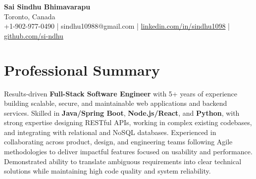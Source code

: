 \documentclass[letterpaper,11pt]{article}
\begin{document}
\begin{center}
  {\Large \textbf{Sai Sindhu Bhimavarapu}} \\
  Toronto, Canada \\
  +1-902-977-0490 \enspace | \enspace sindhu10988@gmail.com \enspace | \enspace \href{https://www.linkedin.com/in/sindhu1098/}{linkedin.com/in/sindhu1098} \enspace | \enspace \href{https://github.com/si-ndhu}{github.com/si-ndhu}
\end{center}

\section{Professional Summary}
  \begin{itemize}[leftmargin=0.15in, label={}]
    \small{\item{
     Results-driven \textbf{Full-Stack Software Engineer} with 5+ years of experience building scalable, secure, and maintainable web applications and backend services. Skilled in \textbf{Java/Spring Boot}, \textbf{Node.js/React}, and \textbf{Python}, with strong expertise designing RESTful APIs, working in complex existing codebases, and integrating with relational and NoSQL databases. Experienced in collaborating across product, design, and engineering teams following Agile methodologies to deliver impactful features focused on usability and performance. Demonstrated ability to translate ambiguous requirements into clear technical solutions while maintaining high code quality and system reliability.
    }}
  \end{itemize}
\vspace{-16pt}

\end{document}
